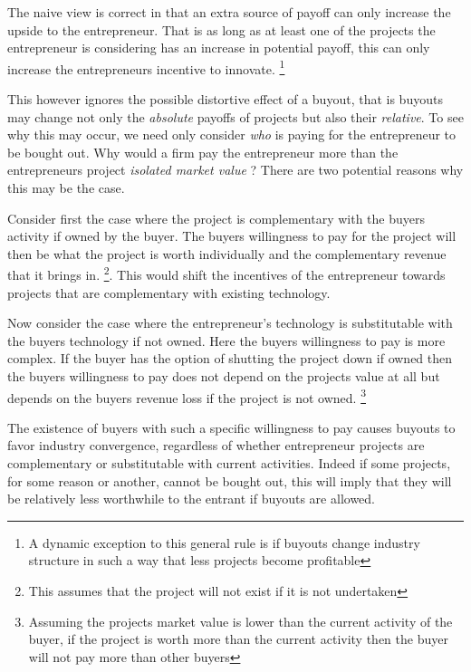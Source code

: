\documentclass[11pt]{article}
\begin{document}

The naive view is correct in that an extra source of payoff can only increase the upside to the entrepreneur. That is as long as at least one of the projects the entrepreneur is considering has an increase in potential payoff, this can only increase the entrepreneurs incentive to innovate. \footnote{A dynamic exception to this general rule is if buyouts change industry structure in such a way that less projects become profitable}

This however ignores the possible distortive effect of a buyout, that is buyouts may change not only the \textit{absolute} payoffs of projects but also their \textit{relative}. To see why this may occur, we need only consider \textit{who} is paying for the entrepreneur to be bought out. Why would a firm pay the entrepreneur more than the entrepreneurs project \textit{isolated market value}  ? There are two potential reasons why this may be the case.


Consider first the case where the project is complementary with the buyers activity if owned by the buyer. The buyers willingness to pay for the project will then be what the project is worth individually and the complementary revenue that it brings in. \footnote{This assumes that the project will not exist if it is not undertaken}. This would shift the incentives of the entrepreneur towards projects that are complementary with existing technology. 

Now consider the case where the entrepreneur's technology is substitutable with the buyers technology if not owned. Here the buyers willingness to pay is more complex. If the buyer has the option of shutting the project down if owned then the buyers willingness to pay does not depend on the projects value at all but depends on the buyers revenue loss if the project is not owned. \footnote{Assuming the projects market value is lower than the current activity of the buyer, if the project is worth more than the current activity then the buyer will not pay more than other buyers}

The existence of buyers with such a specific willingness to pay causes buyouts to favor industry convergence, regardless of whether entrepreneur projects are complementary or substitutable with current activities.  Indeed if some projects, for some reason or another, cannot be bought out, this will imply that they will be relatively less worthwhile to the entrant if buyouts are allowed. 
\end{document}
